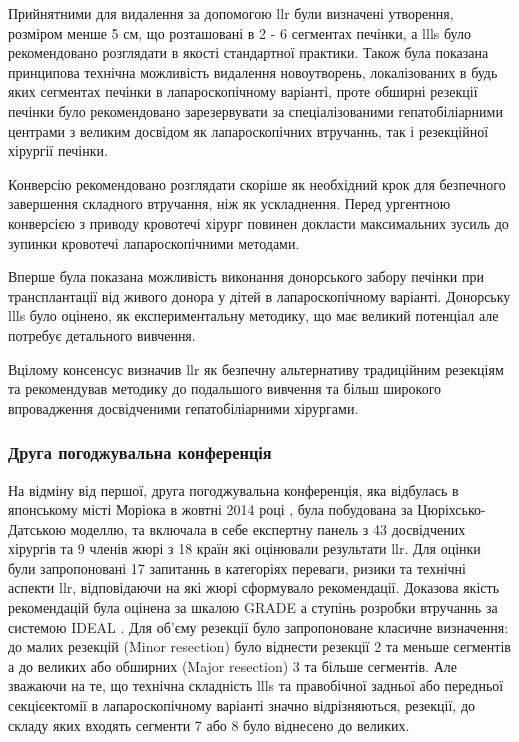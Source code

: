 \begin{refsection}
Прийнятними для видалення за допомогою \acrshort{llr} були визначені утворення, розміром менше 5 см, що розташовані в 2 - 6 сегментах печінки, а \acrshort{llls} було рекомендовано розглядати в якості стандартної практики. Також була показана принципова технічна можливість видалення новоутворень, локалізованих в будь яких сегментах печінки в лапароскопічному варіанті, проте обширні резекції печінки було рекомендовано зарезервувати за спеціалізованими гепатобіліарними центрами з великим досвідом як лапароскопічних втручаннь, так і резекційної хірургії печінки. 

Конверсію рекомендовано розглядати скоріше як необхідний крок для безпечного завершення складного втручання, ніж як ускладнення. Перед ургентною конверсією з приводу кровотечі хірург повинен докласти максимальних зусиль до зупинки кровотечі лапароскопічними методами. 

Вперше була показана можливість виконання донорського забору печінки при трансплантації від живого донора у дітей в лапароскопічному варіанті. Донорську \acrshort{llls} було оцінено, як експериментальну методику, що має великий потенціал але потребує детального вивчення. 

Вцілому консенсус визначив \acrshort{llr} як безпечну альтернативу традиційним резекціям та рекомендував методику до подальшого вивчення та більш широкого впровадження досвідченими гепатобіліарними хірургами.

\subsubsection{Друга погоджувальна конференція} 

На відміну від першої, друга погоджувальна конференція, яка відбулась в японському місті Моріока в жовтні 2014 році \cite{Kaneko2015}, була побудована за Цюріхсько-Датською моделлю, та включала в себе експертну панель з 43 досвідчених хірургів та 9 членів жюрі з 18 країн які оцінювали результати \acrshort{llr}. Для оцінки були запропоновані 17 запитаннь в категоріях переваги, ризики та технічні аспекти \acrshort{llr}, відповідаючи на які жюрі сформувало рекомендації. Доказова якість рекомендацій була оцінена за шкалою GRADE а ступінь розробки втручаннь за системою IDEAL \cite{Guyatt2008, McCulloch2009}. Для об'єму резекції було запропоноване класичне визначення: до малих резекцій (Minor resection) було віднести резекції 2 та меньше сегментів а до великих або обширних (Major resection) 3 та більше сегментів. Але зважаючи на те, що технічна складність \acrshort{llls} та правобічної задньої або передньої секцієектомії в лапароскопічному варіанті значно відрізняються, резекції, до складу яких входять сегменти 7 або 8 було віднесено до великих. 


\end{refsection}
